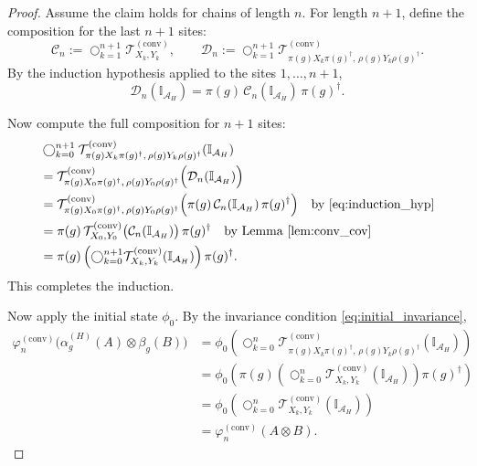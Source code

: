 \documentclass[12pt,a4paper]{article}
\begin{document}
\begin{proof}
Assume the claim holds for chains of length \(n\). For length \(n+1\), define the composition for the last \(n+1\) sites:
\[
\mathcal{C}_n := \bigcirc_{k=1}^{n+1} \mathcal{T}_{X_k,Y_k}^{(\text{conv})}, \qquad
\mathcal{D}_n := \bigcirc_{k=1}^{n+1} \mathcal{T}_{\pi(g) X_k \pi(g)^\dagger, \, \rho(g) Y_k \rho(g)^\dagger}^{(\text{conv})}.
\]
By the induction hypothesis applied to the sites \(1, \dots, n+1\),
\begin{equation}
\mathcal{D}_n(\mathbb{I}_{\mathcal{A}_H}) = \pi(g) \, \mathcal{C}_n(\mathbb{I}_{\mathcal{A}_H}) \, \pi(g)^\dagger.
\label{eq:induction_hyp}
\end{equation}

Now compute the full composition for \(n+1\) sites:
\[
\begin{aligned}
&\bigcirc_{k=0}^{n+1} \mathcal{T}_{\pi(g) X_k \pi(g)^\dagger, \, \rho(g) Y_k \rho(g)^\dagger}^{(\text{conv})}(\mathbb{I}_{\mathcal{A}_H}) \\
&= \mathcal{T}_{\pi(g) X_0 \pi(g)^\dagger, \, \rho(g) Y_0 \rho(g)^\dagger}^{(\text{conv})}\Big( \mathcal{D}_n(\mathbb{I}_{\mathcal{A}_H}) \Big) \\
&= \mathcal{T}_{\pi(g) X_0 \pi(g)^\dagger, \, \rho(g) Y_0 \rho(g)^\dagger}^{(\text{conv})}\Big( \pi(g) \, \mathcal{C}_n(\mathbb{I}_{\mathcal{A}_H}) \, \pi(g)^\dagger \Big) \quad \text{by \eqref{eq:induction_hyp}} \\
&= \pi(g) \, \mathcal{T}_{X_0,Y_0}^{(\text{conv})}\big( \mathcal{C}_n(\mathbb{I}_{\mathcal{A}_H}) \big) \, \pi(g)^\dagger \quad \text{by Lemma \ref{lem:conv_cov}} \\
&= \pi(g) \left( \bigcirc_{k=0}^{n+1} \mathcal{T}_{X_k,Y_k}^{(\text{conv})}(\mathbb{I}_{\mathcal{A}_H}) \right) \pi(g)^\dagger.
\end{aligned}
\]
This completes the induction.

Now apply the initial state \(\phi_0\). By the invariance condition \eqref{eq:initial_invariance},
\[
\begin{aligned}
\varphi_n^{(\text{conv})}\big( \alpha_g^{(H)}(A) \otimes \beta_g(B) \big)
&= \phi_0 \left( \bigcirc_{k=0}^n \mathcal{T}_{\pi(g) X_k \pi(g)^\dagger, \, \rho(g) Y_k \rho(g)^\dagger}^{(\text{conv})}(\mathbb{I}_{\mathcal{A}_H}) \right) \\
&= \phi_0 \left( \pi(g) \left( \bigcirc_{k=0}^n \mathcal{T}_{X_k,Y_k}^{(\text{conv})}(\mathbb{I}_{\mathcal{A}_H}) \right) \pi(g)^\dagger \right) \\
&= \phi_0 \left( \bigcirc_{k=0}^n \mathcal{T}_{X_k,Y_k}^{(\text{conv})}(\mathbb{I}_{\mathcal{A}_H}) \right) \\
&= \varphi_n^{(\text{conv})}(A \otimes B).
\end{aligned}
\]


\end{proof}
\end{document}
